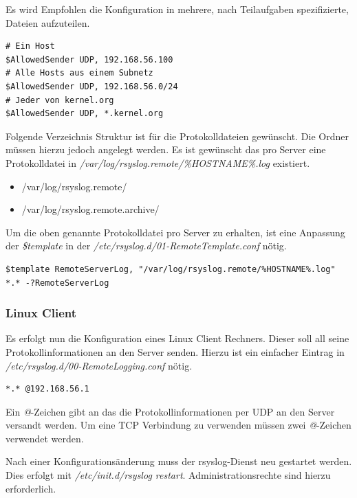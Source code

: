 \begin{informationnote}
Es wird Empfohlen die Konfiguration in mehrere, nach Teilaufgaben spezifizierte, Dateien aufzuteilen.
\end{informationnote}

\begin{lstlisting}
# Ein Host
$AllowedSender UDP, 192.168.56.100
# Alle Hosts aus einem Subnetz
$AllowedSender UDP, 192.168.56.0/24
# Jeder von kernel.org
$AllowedSender UDP, *.kernel.org
\end{lstlisting}

Folgende Verzeichnis Struktur ist für die Protokolldateien gewünscht. Die Ordner müssen hierzu jedoch angelegt werden. Es ist gewünscht das pro Server eine Protokolldatei in \textit{/var/log/rsyslog.remote/\%HOSTNAME\%.log} existiert.

\begin{itemize}
\item /var/log/rsyslog.remote/
\item /var/log/rsyslog.remote.archive/
\end{itemize}

Um die oben genannte Protokolldatei pro Server zu erhalten, ist eine Anpassung der \textit{\$template} in der \textit{/etc/rsyslog.d/01-RemoteTemplate.conf} nötig. \cite{RsyslogSeparateLog}

\begin{lstlisting}
$template RemoteServerLog, "/var/log/rsyslog.remote/%HOSTNAME%.log"
*.* -?RemoteServerLog
\end{lstlisting}

\subsubsection{Linux Client}
Es erfolgt nun die Konfiguration eines Linux Client Rechners. Dieser soll all seine Protokollinformationen an den Server senden. Hierzu ist ein einfacher Eintrag in \textit{/etc/rsyslog.d/00-RemoteLogging.conf} nötig.

\begin{lstlisting}
*.*	@192.168.56.1
\end{lstlisting}

Ein \textit{@}-Zeichen gibt an das die Protokollinformationen per UDP an den Server versandt werden. Um eine TCP Verbindung zu verwenden müssen zwei \textit{@}-Zeichen verwendet werden.

\begin{importantnote}
Nach einer Konfigurationsänderung muss der rsyslog-Dienst neu gestartet werden. Dies erfolgt mit \textit{/etc/init.d/rsyslog restart}. Administrationsrechte sind hierzu erforderlich.
\end{importantnote}

